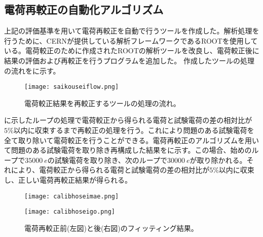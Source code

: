 \subsection{電荷再較正の自動化アルゴリズム}
上記の評価基準を用いて電荷再較正を自動で行うツールを作成した。解析処理を行うために、CERNが提供している解析フレームワークであるROOTを使用している。電荷較正のために作成されたROOTの解析ツールを改良し、電荷較正後に結果の評価および再較正を行うプログラムを追加した。
作成したツールの処理の流れをに示す。

\begin{figure}[tbp]
  \centering
  \texttt{[image: saikouseiflow.png]}
  \caption[電荷較正結果を再較正するツールの処理の流れ]{電荷較正結果を再較正するツールの処理の流れ。}
  \label{fig:saikouseiflow}
\end{figure}


に示したループの処理で電荷較正から得られる電荷と試験電荷の差の相対比が$5\%$以内に収束するまで再較正の処理を行う。これにより問題のある試験電荷を全て取り除いて電荷較正を行うことができる。電荷再較正のアルゴリズムを用いて問題のある試験電荷を取り除き再構成した結果をに示す。この場合、始めのループで$35000\ \si{e}$の試験電荷を取り除き、次のループで$30000\ \si{e}$が取り除かれる。それにより、電荷較正から得られる電荷と試験電荷の差の相対比が$5\%$以内に収束し、正しい電荷再較正結果が得られる。

\begin{figure}[tbp]
  \begin{minipage}[b]{0.5\linewidth}
    \centering
    \texttt{[image: calibhoseimae.png]}
  \end{minipage}
  \begin{minipage}[b]{0.5\linewidth}
    \centering
    \texttt{[image: calibhoseigo.png]}
  \end{minipage}
  \caption[電荷再較正前後のフィッティング結果]{電荷再較正前(左図)と後(右図)のフィッティング結果。}
  \label{fig:calibhosei}
\end{figure}


